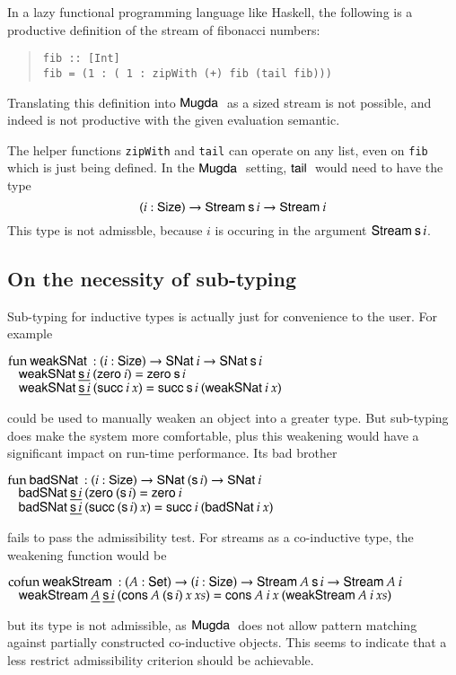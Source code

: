 In a lazy functional programming language like Haskell, the following is a productive definition of the stream of fibonacci numbers:
\begin{quote}
\begin{verbatim}
fib :: [Int]
fib = (1 : ( 1 : zipWith (+) fib (tail fib)))
\end{verbatim}
\end{quote}
Translating this definition into $\textsf{Mugda }$ as a sized stream is not possible,
and indeed is not productive with the given evaluation semantic.

The helper functions \verb+zipWith+ and \verb+tail+ can operate on any list, even on \verb+fib+ which is just being defined.
In the $\textsf{Mugda }$ setting, $\mathsf{tail}\:$ would need to have the type
\[ ( i : \mathsf{Size} ) \rightarrow \mathsf{Stream}\: \mathsf{s}\, i \rightarrow \mathsf{Stream}\: i \]
\noindent This type is not admissble, because $i$ is occuring in the argument $\mathsf{Stream}\: \mathsf{s}\, i$.

\subsection{On the necessity of sub-typing}
Sub-typing for inductive types is actually just for convenience to the user. 
For example
\begin{bsp}
$\mathrm{fun}\: \mathsf{weakSNat}\: : (i : \mathsf{Size} ) \rightarrow \mathsf{SNat}\: i \rightarrow \mathsf{SNat}\: \mathsf{s}\, i$\\
$\hspace*{3mm} \mathsf{weakSNat}\: \underline{\mathsf{s}\, i} \: (\mathsf{zero}\: i) = \mathsf{zero}\: \mathsf{s}\, i$\\
$\hspace*{3mm} \mathsf{weakSNat}\: \underline{\mathsf{s}\, i} \: (\mathsf{succ}\: i \: x) = \mathsf{succ}\: \mathsf{s}\, i \: (\mathsf{weakSNat}\: i \: x) $
\end{bsp}
could be used to manually weaken an object into a greater type.
But sub-typing does make the system more comfortable, plus this weakening would have
a significant impact on run-time performance.
Its bad brother 
\begin{bsp}
$\mathrm{fun}\: \mathsf{badSNat}\: : (i : \mathsf{Size} ) \rightarrow \mathsf{SNat}\: (\mathsf{s}\, i) \rightarrow \mathsf{SNat}\: i$\\
$\hspace*{3mm} \mathsf{badSNat}\: \underline{\mathsf{s}\, i} \: (\mathsf{zero}\: (\mathsf{s}\, i) = \mathsf{zero}\: i$\\
$\hspace*{3mm} \mathsf{badSNat}\: \underline{\mathsf{s}\, i} \: (\mathsf{succ}\: (\mathsf{s}\, i) \: x) = \mathsf{succ}\: i \: (\mathsf{badSNat}\: i \: x) $
\end{bsp}
fails to pass the admissibility test. 
For streams as a co-inductive type, the weakening function would be
\begin{bsp}
$\mathrm{cofun}\: \mathsf{weakStream}\: : ( A : \mathsf{Set} ) \rightarrow (i : \mathsf{Size} ) \rightarrow \mathsf{Stream}\: A \: \mathsf{s}\, i \rightarrow \mathsf{Stream}\: A \: i$\\
$\hspace*{3mm} \mathsf{weakStream}\: \underline{A} \: \underline{\mathsf{s}\, i} \: (\mathsf{cons}\: A \: (\mathsf{s}\, i) \: x \: xs) = \mathsf{cons}\: A \: i \: x \: (\mathsf{weakStream}\: A \: i \: xs) $
\end{bsp}
but its type is not admissible, as $\textsf{Mugda }$ does not allow pattern matching against 
partially constructed co-inductive objects. 
This seems to indicate that a less restrict admissibility criterion should be achievable.

